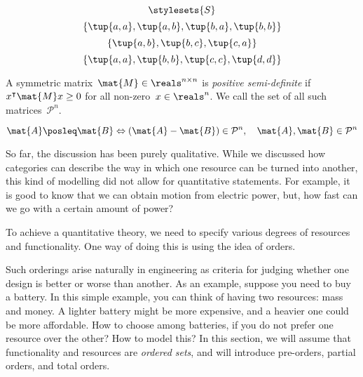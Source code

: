 {\begin{forslides}
\begin{equation*}
            \label{eq:pow_7}
            \stylesets{S}
        \end{equation*}
        \begin{equation*}
            \label{eq:pre_ex1}
            \{\tup{a,a},\tup{a,b},\tup{b,a},\tup{b,b}\}
        \end{equation*}
        \begin{equation*}
            \label{eq:pre_ex2}
            \{\tup{a,b},\tup{b,c},\tup{c,a}\}
        \end{equation*}
        \begin{equation*}
            \label{eq:pre_ex3}
            \{\tup{a,a},\tup{b,b},\tup{c,c},\tup{d,d}\}
        \end{equation*}
        \begin{definition}
            \label{def:posdef}
            A symmetric matrix~$\mat{M}\in \reals^{n\times n}$ is \emph{positive semi-definite} if~$x^\intercal \mat{M}x\geq 0$ for all non-zero~$x\in \reals^n$.
            We call the set of all such matrices~$\mathcal{P}^n$.
        \end{definition}
        \begin{equation*}
            \label{eq:posdef_1}
            \mat{A}\posleq \mat{B} \Leftrightarrow (\mat{A}-\mat{B})\in \mathcal{P}^n, \quad \mat{A},\mat{B}\in \mathcal{P}^n
        \end{equation*}
    \end{forslides}
}

So far, the discussion has been purely qualitative.
While we discussed how categories can describe the way in which one resource can be turned into another, this kind of modelling did not allow for quantitative statements.
For example, it is good to know that we can obtain motion from electric power, but, how fast can we go with a certain amount of power?

To achieve a quantitative theory, we need to specify various degrees of resources and functionality.
One way of doing this is using the idea of orders.

Such orderings arise naturally in engineering as criteria for judging whether one design is better or worse than another.
As an example, suppose you need to buy a battery.
In this simple example, you can think of having two resources: mass and money.
A lighter battery might be more expensive, and a heavier one could be more affordable.
How to choose among batteries, if you do not prefer one resource over the other?
How to model this?
In this section, we will assume that functionality and resources are \emph{ordered sets}, and will introduce pre-orders, partial orders, and total orders.

